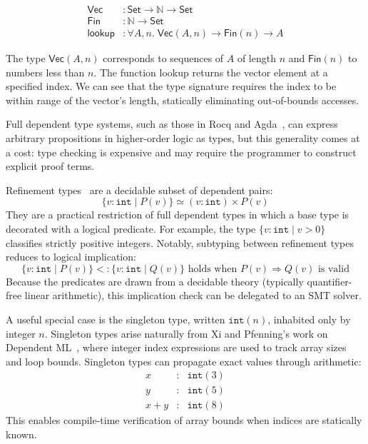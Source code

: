 \[
  \begin{aligned}
    \textsf{Vec}    & : \textsf{Set} \rightarrow \mathbb{N} \rightarrow \textsf{Set} \\
    \textsf{Fin}    & : \mathbb{N} \rightarrow \textsf{Set}                          \\
    \textsf{lookup} & : \forall A,n.\;
    \textsf{Vec}(A,n)
    \to \textsf{Fin}(n)
    \to A
  \end{aligned}
\]

\noindent The type $\textsf{Vec}(A,n)$ corresponds to sequences of $A$ of length $n$ and $\textsf{Fin}(n)$ to numbers less than $n$. The function \textsf{lookup} returns the vector element at a specified index. We can see that the type signature requires the index to be within range of the vector's length, statically eliminating out-of-bounds accesses.

Full dependent type systems, such as those in Rocq and Agda~\cite{Bove2009Agda}, can express arbitrary propositions in higher-order logic as types, but this generality comes at a cost: type checking is expensive and may require the programmer to construct explicit proof terms.

Refinement types~\cite{Rondon2008Liquid} are a decidable subset of dependent pairs:
\[
  \{v : \mathtt{int} \mid P(v)\} \simeq (v : \mathtt{int}) \times P(v)
\]
They are a practical restriction of full dependent types in which a base type is decorated with a logical predicate. For example, the type $\{v\!:\!\mathtt{int} \mid v > 0\}$ classifies strictly positive integers. Notably, subtyping between refinement types reduces to logical implication:
\[
  \{v\!:\!\mathtt{int} \mid P(v)\} <: \{v\!:\!\mathtt{int} \mid Q(v)\} \text{ holds when } P(v) \Rightarrow Q(v) \text{ is valid}
\]
Because the predicates are drawn from a decidable theory (typically quantifier-free linear arithmetic), this implication check can be delegated to an SMT solver.

A useful special case is the singleton type, written $\mathtt{int}(n)$, inhabited only by integer $n$. Singleton types arise naturally from Xi and Pfenning's work on Dependent ML~\cite{Xi1999DML}, where integer index expressions are used to track array sizes and loop bounds. Singleton types can propagate exact values through arithmetic:
\[
  \begin{array}{rcl}
    x     & : & \mathtt{int}(3) \\
    y     & : & \mathtt{int}(5) \\
    x + y & : & \mathtt{int}(8)
  \end{array}
\]
This enables compile-time verification of array bounds when indices are statically known.

